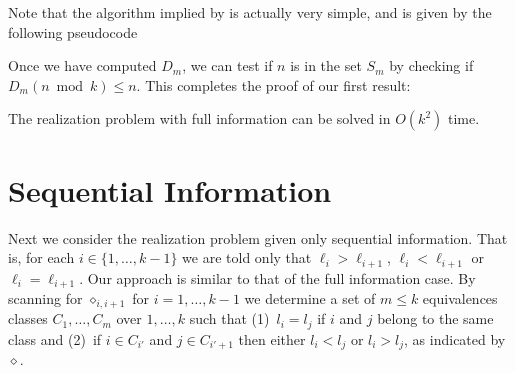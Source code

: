\documentclass[lotsofwhite]{patmorin}
\newcommand{\op}{\diamond}
\begin{document}
Note that the algorithm implied by  is actually very
simple, and is given by the following pseudocode

\begin{algorithmic}[1]
  \ENDFOR
  \ENDFOR
\ENDFOR
\end{algorithmic}


Once we have computed $D_{m}$, we can test if $n$ is in the set $S_m$ by
checking if $D_m(n\bmod k) \le n$.  This completes the proof of our
first result:

\begin{thm}
The realization problem with full information can be solved in
$O(k^2)$ time.
\end{thm}



\section{Sequential Information}

Next we consider the realization problem given only sequential
information.  That is, for each $i\in\{1,\ldots,k-1\}$ we are told
only that $\ell_i > \ell_{i+1}$, $\ell_i < \ell_{i+1}$ or
$\ell_i=\ell_{i+1}$.  Our approach is similar to that of the full
information case.  By scanning for $\op_{i,i+1}$ for $i=1,\ldots,k-1$
we determine a set of $m\le k$ equivalences classes $C_1,\ldots,C_m$
over $1,\ldots,k$ such that (1)~$l_i=l_j$ if $i$ and $j$ belong to the
same class and (2)~if $i\in C_{i'}$ and $j\in C_{i'+1}$ then either
$l_i<l_j$ or $l_i > l_j$, as indicated by $\op$. 
\end{document}
